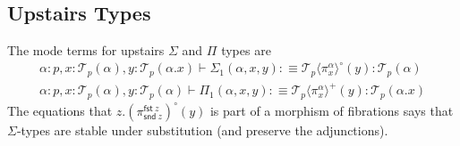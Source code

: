 \documentclass[10pt]{article}
\theoremstyle{definition}
\newcommand\dsd[1]{\ensuremath{\mathsf{#1}}}
\newcommand{\yields}{\vdash}
\newcommand\F[2]{\ensuremath{\mathsf{F}_{#1}(#2)}}
\newcommand\St[2]{\ensuremath{{#1}^*(#2)}}
\newcommand\StI[2]{\ensuremath{\mathsf{st}_{#1}(#2)}}
\newcommand\FE[3]{\ensuremath{\mathsf{let} \, \mathsf{F}(#2) \, = \, {#1} \, \mathsf{in} \, #3}}
\newcommand\TrPlus[2]{\ensuremath{{#1}^+(#2)}}
\newcommand\TrCirc[2]{\ensuremath{{#1}^\circ(#2)}}
\newcommand\El[2]{\mathcal{T}_{#1}(#2)}
\newcommand\ApEl[2]{\mathcal{T}_{#1}\langle#2\rangle}
\newcommand\ap[2]{\ensuremath{#1 \langle #2 \rangle }}
\newcommand\ApCirc[2]{\ensuremath{{#1}^\circ \langle #2 \rangle }}
\newcommand{\app}[2]{\ensuremath{#1 \: #2}}
\newcommand{\fst}[1]{\app{\dsd{fst}}{#1}}
\newcommand{\snd}[1]{\app{\dsd{snd}}{#1}}
\newcommand{\telety}[3]{\ensuremath{(#1{:}#2,#3)}}
\begin{document}

\subsection{Upstairs Types}

The mode terms for upstairs $\Sigma$ and $\Pi$ types are
\begin{align*}
\alpha : p, x : \El{p}{\alpha}, y : \El{p}{\alpha.x} \yields \Sigma_1(\alpha,x,y) :\equiv \TrCirc{\ApEl{p}{\pi^\alpha_x}}{y}  : \El{p}{\alpha}\\
\alpha : p, x : \El{p}{\alpha}, y : \El{p}{\alpha} \yields \Pi_1(\alpha,x,y) :\equiv \TrPlus{\ApEl{p}{\pi^\alpha_x}}{y} : \El{p}{\alpha.x}
\end{align*}
The equations that $z.\TrCirc{(\pi^{\fst z}_{\snd{z}})}{y}$ is part of a
morphism of fibrations says that $\Sigma$-types are stable under
substitution (and preserve the adjunctions).
\end{document}
